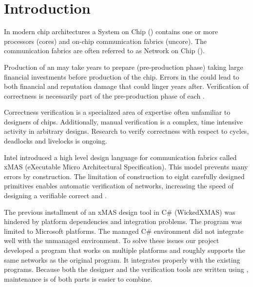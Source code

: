 \chapter*{Introduction}

In modern chip architectures a System on Chip (\Soc) contains one or more processors (cores) and 
on-chip communication fabrics (uncore). The communication fabrics are often referred 
to as Network on Chip (\Noc).

Production of an \Noc may take years to prepare (pre-production phase) taking large financial investments
before production of the chip. Errors in the \Noc could lead to both financial and reputation 
damage that could linger years after. Verification of correctness is necessarily part of the 
pre-production phase of each \Noc.

Correctness verification is a specialized area of expertise often unfamiliar to designers of chips.
Additionally, manual verification is a complex, time intensive activity in arbitrary designs.
Research to verify correctness with respect to cycles, deadlocks and livelocks is ongoing. 

Intel introduced a high level design language for communication fabrics called xMAS (eXecutable 
Micro Architectural Specification). This model prevents many errors by 
construction\cite{DBLP:journals/dt/ChatterjeeKO12}. The limitation of construction to eight 
carefully designed primitives enables automatic verification of networks, increasing the 
speed of designing a verifiable correct \Noc and \Soc.

The previous installment of an xMAS design tool in C\# (WickedXMAS) was hindered by platform 
dependencies and \cpp integration problems. The program was limited to Microsoft platforms. The
managed C\# environment did not integrate well with the unmanaged \cpp environment.
To solve these issues our project developed a program that works on multiple platforms and 
roughly supports the same networks as the original program. It integrates properly with the existing \cpp 
programs. Because both the \xmas designer and the verification tools are written 
using \cpp, maintenance is of both parts is easier to combine.

